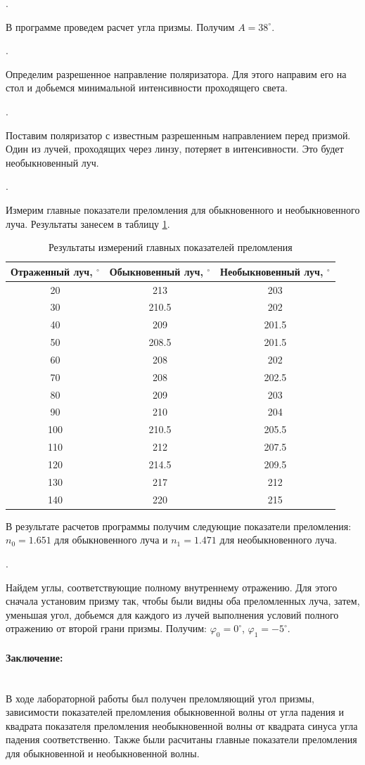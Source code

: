 \documentclass[a4paper, 12pt]{article}
\newcommand{\parag}[1]{\paragraph*{#1:}}
\newcounter{Points}
\newcommand{\point}{\arabic{Points}. \addtocounter{Points}{1}}
\begin{document}
    \point В программе проведем расчет угла призмы. Получим $A = 38^\circ$.

    \point Определим разрешенное направление поляризатора. Для этого направим его на стол и добьемся минимальной интенсивности проходящего света.

    \point Поставим поляризатор с известным разрешенным направлением перед призмой. Один из лучей, проходящих через линзу, потеряет в интенсивности. Это будет необыкновенный луч.

    \point Измерим главные показатели преломления для обыкновенного и необыкновенного луча. Результаты занесем в таблицу \ref{tabl:data_2}.

    \begin{table}[h]
        \centering
        \begin{tabular}{|c|c|c|}
            \hline
            Отраженный луч, $^\circ$ & Обыкновенный луч, $^\circ$  & Необыкновенный луч, $^\circ$  \\ \hline
            20  & 213    & 203 \\ \hline
            30  & 210.5  & 202 \\ \hline
            40  & 209    & 201.5 \\ \hline
            50  & 208.5  & 201.5 \\ \hline
            60  & 208    & 202 \\ \hline
            70  & 208    & 202.5 \\ \hline
            80  & 209    & 203 \\ \hline
            90  & 210    & 204 \\ \hline
            100 & 210.5 & 205.5 \\ \hline
            110 & 212   & 207.5 \\ \hline
            120 & 214.5 & 209.5 \\ \hline
            130 & 217   & 212 \\ \hline
            140 & 220   & 215 \\ \hline
        \end{tabular}
        \caption{Результаты измерений главных показателей преломления}
        \label{tabl:data_2}
    \end{table}

    В результате расчетов программы получим следующие показатели преломления: $n_0 = 1.651$ для обыкновенного луча и $n_1 = 1.471$ для необыкновенного луча.

    \point Найдем углы, соответствующие полному внутреннему отражению. Для этого сначала установим призму так, чтобы были видны оба преломленных луча, затем, уменьшая угол, добьемся для каждого из лучей выполнения условий полного отражению от второй грани призмы. Получим: $\varphi_0 = 0^\circ$, $\varphi_1 = -5^\circ$.  

\parag {Заключение} ~\\
    В ходе лабораторной работы был получен преломляющий угол призмы, зависимости показателей преломления обыкновенной волны от угла падения и квадрата показателя преломления необыкновенной волны от квадрата синуса угла падения соответственно. Также были расчитаны главные показатели преломления для обыкновенной и необыкновенной волны. 
    
\end{document}
